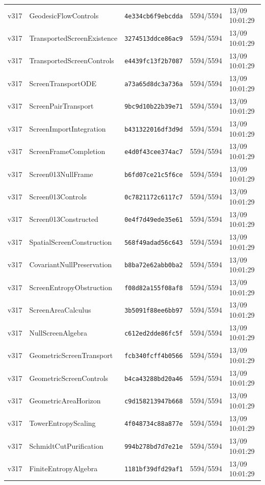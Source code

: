 \documentclass[11pt]{article}
\theoremstyle{definition}\newtheorem{deriv}{Derivação}
\begin{document}
{\begin{longtable}{@{}lllll@{}}
v317 & GeodesicFlowControls & \texttt{4e334cb6f9ebcdda} & 5594/5594 & 13/09 10:01:29 \\
v317 & TransportedScreenExistence & \texttt{3274513ddce86ac9} & 5594/5594 & 13/09 10:01:29 \\
v317 & TransportedScreenControls & \texttt{e4439fc13f2b7087} & 5594/5594 & 13/09 10:01:29 \\
v317 & ScreenTransportODE & \texttt{a73a65d8dc3a736a} & 5594/5594 & 13/09 10:01:29 \\
v317 & ScreenPairTransport & \texttt{9bc9d10b22b39e71} & 5594/5594 & 13/09 10:01:29 \\
v317 & ScreenImportIntegration & \texttt{b431322016df3d9d} & 5594/5594 & 13/09 10:01:29 \\
v317 & ScreenFrameCompletion & \texttt{e4d0f43cee374ac7} & 5594/5594 & 13/09 10:01:29 \\
v317 & Screen013NullFrame & \texttt{b6fd07ce21c5f6ce} & 5594/5594 & 13/09 10:01:29 \\
v317 & Screen013Controls & \texttt{0c7821172c6117c7} & 5594/5594 & 13/09 10:01:29 \\
v317 & Screen013Constructed & \texttt{0e4f7d49ede35e61} & 5594/5594 & 13/09 10:01:29 \\
v317 & SpatialScreenConstruction & \texttt{568f49adad56c643} & 5594/5594 & 13/09 10:01:29 \\
v317 & CovariantNullPreservation & \texttt{b8ba72e62abb0ba2} & 5594/5594 & 13/09 10:01:29 \\
v317 & ScreenEntropyObstruction & \texttt{f08d82a155f08af8} & 5594/5594 & 13/09 10:01:29 \\
v317 & ScreenAreaCalculus & \texttt{3b5091f88ee6bb97} & 5594/5594 & 13/09 10:01:29 \\
v317 & NullScreenAlgebra & \texttt{c612ed2dde86fc5f} & 5594/5594 & 13/09 10:01:29 \\
v317 & GeometricScreenTransport & \texttt{fcb340fcff4b0566} & 5594/5594 & 13/09 10:01:29 \\
v317 & GeometricScreenControls & \texttt{b4ca43288bd20a46} & 5594/5594 & 13/09 10:01:29 \\
v317 & GeometricAreaHorizon & \texttt{c9d158213947b668} & 5594/5594 & 13/09 10:01:29 \\
v317 & TowerEntropyScaling & \texttt{4f048734c88a877e} & 5594/5594 & 13/09 10:01:29 \\
v317 & SchmidtCutPurification & \texttt{994b278bd7d7e21e} & 5594/5594 & 13/09 10:01:29 \\
v317 & FiniteEntropyAlgebra & \texttt{1181bf39dfd29af1} & 5594/5594 & 13/09 10:01:29 \\

\end{longtable}}
\end{document}
